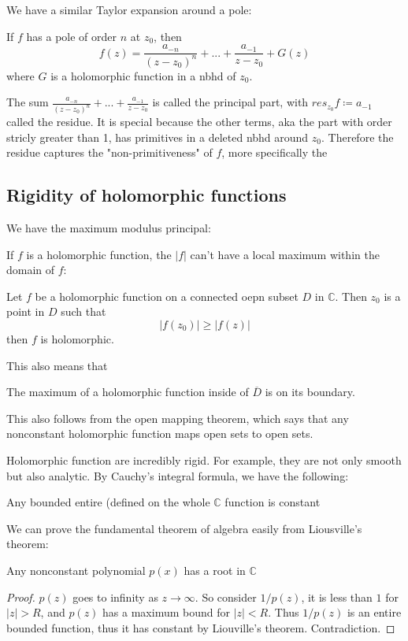 \documentclass[main.tex]{subfiles}
\begin{document}
We have a similar Taylor expansion around a pole:

\begin{theorem}
If $f$ has a pole of order $n$ at $z_0$, then
$$
f(z) = \frac{a_{-n}}{(z-z_0)^n} + ... + \frac{a_{-1}}{z-z_0} + G(z)
$$
where $G$ is a holomorphic function in a nbhd of $z_0$.
\end{theorem}
The sum $\frac{a_{-n}}{(z-z_0)^n} + ... + \frac{a_{-1}}{z-z_0}$ is called the principal part, with $res_{z_0} f \coloneqq a_{-1}$ called the residue. It is special because the other terms, aka the part with order stricly greater than 1, has primitives in a deleted nbhd around $z_0$. Therefore the residue captures the "non-primitiveness" of $f$, more specifically the 
\subsection{Rigidity of holomorphic functions}

We have the maximum modulus principal:

If $f$ is a holomorphic function, the $|f|$ can't have a local maximum within the domain of $f$:

\begin{theorem}
Let $f$ be a holomorphic function on a connected oepn subset $D$ in $\mathbb{C}$. Then $z_0$ is a point in $D$ such that 
$$
|f(z_0)| \geq |f(z)|
$$
then $f$ is holomorphic.
\end{theorem}
This also means that 

\begin{corollary}
The maximum of a holomorphic function inside of $\overline{D}$ is on its boundary.
\end{corollary}
This also follows from the open mapping theorem, which says that any nonconstant holomorphic function maps open sets to open sets.

Holomorphic function are incredibly rigid. For example, they are not only smooth but also analytic. By Cauchy's integral formula, we have the following:

\begin{theorem}
Any bounded entire (defined on the whole $\mathbb{C}$ function is constant
\end{theorem}

We can prove the fundamental theorem of algebra easily from Liousville's theorem:

\begin{corollary}
Any nonconstant polynomial $p(x)$ has a root in $\mathbb{C}$
\end{corollary}
\begin{proof}
$p(z)$ goes to infinity as $z \rightarrow \infty$. So consider $1/p(z)$, it is less than $1$ for $|z| > R$, and $p(z)$ has a  maximum bound for $|z| < R$. Thus $1/p(z)$ is an entire bounded function, thus it has constant by Liouville's theorem. Contradiction.
\end{proof}
\end{document}
